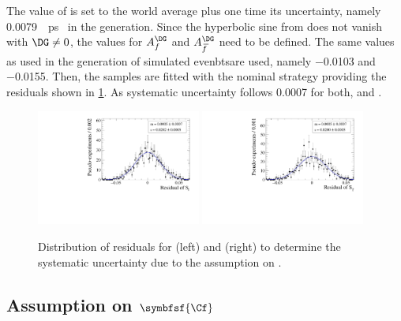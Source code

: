 The value of \DG is set to the world average plus one time its uncertainty, namely \SI{0.0079}{\per\pico\second}~\cite{HFLAV2016} in the generation.
Since the hyperbolic sine from  does not vanish with $\DG\neq0$, the values for $A_f^{\DG}$ and $A_{\kern 1.5pt\overline{\kern -1.5pt f\kern 1.5pt}}^{\DG}$ need to be defined.
The same values as used in the generation of simulated evenbtsare used, namely \num{-0.0103} and \num{-0.0155}.
Then, the samples are fitted with the nominal strategy providing the residuals shown in \cref{fig:systUncertDG}.
As systematic uncertainty follows \num{0.0007} for both, \Sf and \Sfbar.
\begin{figure}[tbp]
    \centering
    \includegraphics[width=0.48\textwidth]{10Systematics/figs/DG_Sf_res.pdf}
    \includegraphics[width=0.48\textwidth]{10Systematics/figs/DG_Sfbar_res.pdf}
    \caption{Distribution of residuals for \Sf (left) and \Sfbar (right) to determine the systematic uncertainty due to the assumption on \DG.}
    \label{fig:systUncertDG}
\end{figure}

\subsection*{Assumption on $\symbfsf{\Cf}$}

